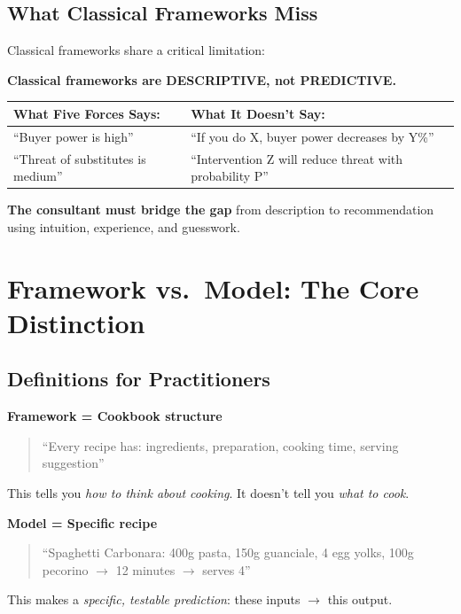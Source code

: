 \subsection{What Classical Frameworks Miss}

Classical frameworks share a critical limitation:

\begin{tcolorbox}[colback=red!5!white, colframe=red!75!black,
    title=\textbf{The Missing Element}]

\textbf{Classical frameworks are DESCRIPTIVE, not PREDICTIVE.}

\begin{center}
\renewcommand{\arraystretch}{1.3}
\begin{tabular}{@{}p{6cm}p{6cm}@{}}
\textbf{What Five Forces Says:} & \textbf{What It Doesn't Say:} \\
\midrule
``Buyer power is high'' & ``If you do X, buyer power decreases by Y\%'' \\
``Threat of substitutes is medium'' & ``Intervention Z will reduce threat with probability P'' \\
\end{tabular}
\end{center}

\textbf{The consultant must bridge the gap} from description to recommendation
using intuition, experience, and guesswork.

\end{tcolorbox}



\section{Framework vs.\ Model: The Core Distinction}
\label{sec:consulting-fw-model}

\subsection{Definitions for Practitioners}

\begin{tcolorbox}[colback=blue!5!white, colframe=blue!75!black,
    title=\textbf{The Cookbook Analogy}]

\textbf{Framework = Cookbook structure}
\begin{quote}
``Every recipe has: ingredients, preparation, cooking time, serving suggestion''
\end{quote}
This tells you \textit{how to think about cooking}. It doesn't tell you \textit{what to cook}.

\textbf{Model = Specific recipe}
\begin{quote}
``Spaghetti Carbonara: 400g pasta, 150g guanciale, 4 egg yolks, 100g pecorino $\rightarrow$ 12 minutes $\rightarrow$ serves 4''
\end{quote}
This makes a \textit{specific, testable prediction}: these inputs $\rightarrow$ this output.

\end{tcolorbox}

